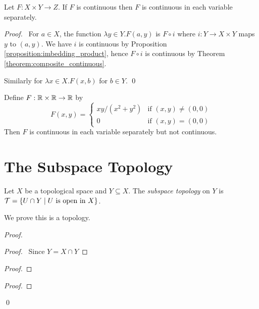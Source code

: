 \begin{proposition}
    Let $F : X \times Y \rightarrow Z$. If $F$ is continuous then $F$ is continuous in each
    variable separately.
\end{proposition}

\begin{proof}
    \pf\ For $a \in X$, the function $\lambda y \in Y. F(a,y)$ is $F \circ i$ where $i : Y \rightarrow X \times Y$ maps $y$ to $(a,y)$.
    We have $i$ is continuous by Proposition \ref{proposition:imbedding_product}, hence $F \circ i$ is continuous by Theorem \ref{theorem:composite_continuous}.

    Similarly for $\lambda x \in X. F(x,b)$ for $b \in Y$. \qed
\end{proof}

\begin{example}
    Define $F : \mathbb{R} \times \mathbb{R} \rightarrow \mathbb{R}$ by
    \[ F(x,y) = \begin{cases}
        xy / (x^2 + y^2) & \text{if } (x,y) \neq (0,0) \\
        0 & \text{if } (x,y) = (0,0)
    \end{cases} \]
    Then $F$ is continuous in each variable separately but not continuous.
\end{example}

\section{The Subspace Topology}

\begin{definition}
    Let $X$ be a topological space and $Y \subseteq X$. The \emph{subspace topology} on $Y$ is
    $\mathcal{T} = \{ U \cap Y \mid U \text{ is open in } X \}$.
\end{definition}

We prove this is a topology.

\begin{proof}
    \pf
    \begin{proof}
        \pf\ Since $Y = X \cap Y$
    \end{proof}
    \begin{proof}
    \end{proof}
    \begin{proof}
    \end{proof}
    \qed
\end{proof}

